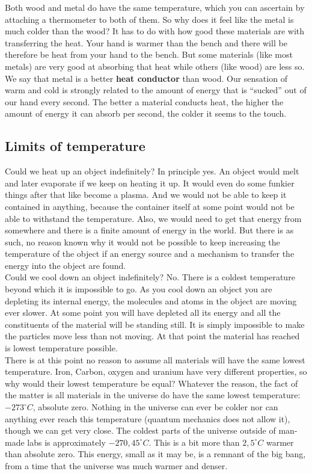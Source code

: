 \noindent Both wood and metal do have the same temperature, which you can ascertain by attaching a thermometer to both of them. So why does it feel like the metal is much colder than the wood? It has to do with how good these materials are with transferring the heat. Your hand is warmer than the bench and there will be therefore be heat from your hand to the bench. But some materials (like most metals) are very good at absorbing that heat while others (like wood) are less so. We say that metal is a better \textbf{heat conductor} than wood. Our sensation of warm and cold is strongly related to the amount of energy that is "`sucked"' out of our hand every second. The better a material conducts heat, the higher the amount of energy it can absorb per second, the colder it seems to the touch.

\subsection{Limits of temperature}

\noindent Could we heat up an object indefinitely? In principle yes. An object would melt and later evaporate if we keep on heating it up. It would even do some funkier things after that like become a plasma. And we would not be able to keep it contained in anything, because the container itself at some point would not be able to withstand the temperature. Also, we would need to get that energy from somewhere and there is a finite amount of energy in the world. But there is as such, no reason known why it would not be possible to keep increasing the temperature of the object if an energy source and a mechanism to transfer the energy into the object are found.\\

\noindent Could we cool down an object indefinitely? No. There is a coldest temperature beyond which it is impossible to go. As you cool down an object you are depleting its internal energy, the molecules and atoms in the object are moving ever slower. At some point you will have depleted all its energy and all the constituents of the material will be standing still. It is simply impossible to make the particles move less than not moving. At that point the material has reached is lowest temperature possible.\\

\noindent There is at this point no reason to assume all materials will have the same lowest temperature. Iron, Carbon, oxygen and uranium have very different properties, so why would their lowest temperature be equal? Whatever the reason, the fact of the matter is all materials in the universe do have the same lowest temperature: $-273^{\circ} C$, absolute zero. Nothing in the universe can ever be colder nor can anything ever reach this temperature (quantum mechanics does not allow it), though we can get very close. The coldest parts of the universe outside of man-made labs is approximately $-270,45^{\circ} C$. This is a bit more than $2,5^{\circ} C$ warmer than absolute zero. This energy, small as it may be, is a remnant of the big bang, from a time that the universe was much warmer and denser.\\

